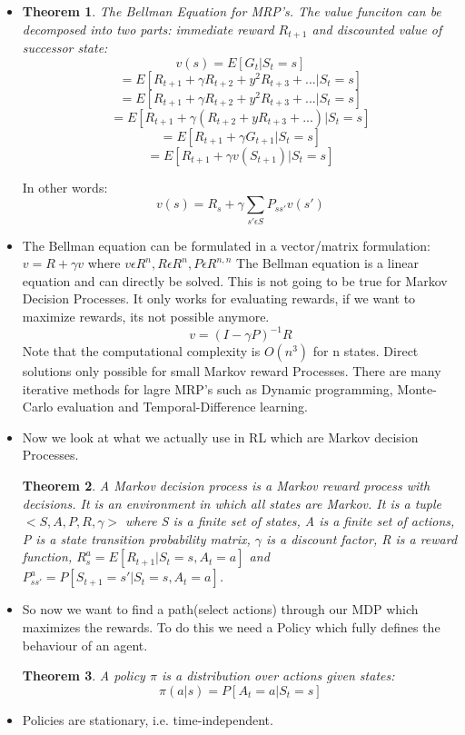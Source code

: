 \documentclass[a4paper]{article}
\newtheorem{theorem}{Theorem}
\begin{document}
\begin{itemize}
    \item 
    \begin{theorem}
    The Bellman Equation for MRP's. The value funciton can be decomposed into two parts: immediate reward $R_{t+1}$ and discounted value of successor state: 
    $$v(s) = E[G_t | S_t = s]$$
    $$= E[R_{t+1} + \gamma R_{t+2} + y^2 R_{t+3}+ ... | S_t = s]$$
    $$= E[R_{t+1} + \gamma R_{t+2} + y^2 R_{t+3}+ ... | S_t = s]$$
    $$= E[R_{t+1} + \gamma(R_{t+2} + y R_{t+3}+ ...) | S_t = s]$$
    $$= E[R_{t+1} + \gamma G_{t+1}| S_t = s]$$
    $$= E[R_{t+1} + \gamma v(S_{t+1}) | S_t = s]$$
    \end{theorem}
    In other words: $$ v(s) = R_s + \gamma \sum_{s'\epsilon S} P_{ss'}v(s')$$
    \item The Bellman equation can be formulated in a vector/matrix formulation: $v = R + \gamma v$ where $v \epsilon R^n, R \epsilon R^n, P \epsilon R^{n,n}$
    The Bellman equation is a linear equation and can directly be solved. This is not going to be true for Markov Decision Processes. It only works for evaluating rewards, if we want to maximize rewards, its not possible anymore. 
    $$v = (I-\gamma P)^{-1} R$$
    Note that the computational complexity is $O(n^3)$ for n states. Direct solutions only possible for small Markov reward Processes. There are many iterative methods for lagre MRP's such as Dynamic programming, Monte-Carlo evaluation and Temporal-Difference learning. 
    \item Now we look at what we actually use in RL which are Markov decision Processes. 
    \begin{theorem}
    A Markov decision process is a Markov reward process with decisions. It is an environment in which all states are Markov. It is a tuple $<S, A, P, R, \gamma>$ where S is a finite set of states, A is a finite set of actions, P is a state transition probability matrix, $\gamma$ is a discount factor, R is a reward function, $R_s^a = E[R_{t+1} | S_t = s, A_t = a]$ and $P_{ss'}^a = P[S_{t+1} = s' | S_t = s, A_t = a]$.
    \end{theorem}
    \item So now we want to find a path(select actions) through our MDP which maximizes the rewards. To do this we need a Policy which fully defines the behaviour of an agent. 
    \begin{theorem}
    A policy $\pi$ is a distribution over actions given states:
    $$\pi(a|s) = P[A_t = a|S_t=s]$$
    \end{theorem}
    \item Policies are stationary, i.e. time-independent. 

\end{itemize}
\end{document}
